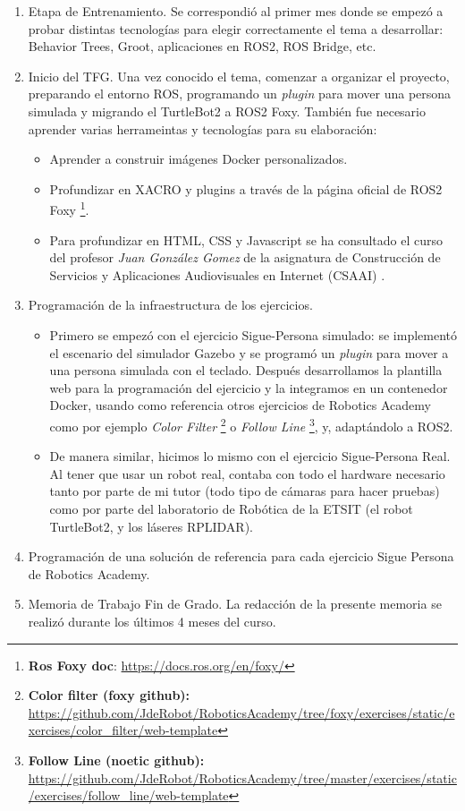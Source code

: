 \begin{enumerate}
	\item Etapa de Entrenamiento. Se correspondió al primer mes donde se empezó a probar distintas tecnologías para elegir correctamente el tema a desarrollar: Behavior Trees, Groot, aplicaciones en ROS2, ROS Bridge, etc.
	\item Inicio del TFG. Una vez conocido el tema, comenzar a organizar el proyecto, preparando el entorno ROS, programando un \textit{plugin} para mover una persona simulada y migrando el TurtleBot2 a ROS2 Foxy. También fue necesario aprender varias herrameintas y tecnologías para su elaboración:
	\begin{itemize}
		\item Aprender a construir imágenes Docker personalizados.
		\item Profundizar en XACRO y plugins a través de la página oficial de ROS2 Foxy \footnote{\textbf{Ros Foxy doc}: \url{https://docs.ros.org/en/foxy/}}.
		\item Para profundizar en HTML, CSS y Javascript se ha consultado el curso del profesor \textit{Juan González Gomez} de la asignatura de Construcción de Servicios y Aplicaciones Audiovisuales en Internet (CSAAI) \cite{CSAAI}.
	\end{itemize}
	\item Programación de la infraestructura de los ejercicios.
	\begin{itemize}
		\item Primero se empezó con el ejercicio Sigue-Persona simulado: se implementó el escenario del simulador Gazebo y se programó un \textit{plugin} para mover a una persona simulada con el teclado. Después desarrollamos la plantilla web para la programación del ejercicio y la integramos en un contenedor Docker, usando como referencia otros ejercicios de Robotics Academy como por ejemplo \textit{Color Filter} \footnote{\textbf{Color filter (foxy github):} \url{https://github.com/JdeRobot/RoboticsAcademy/tree/foxy/exercises/static/exercises/color_filter/web-template}} o \textit{Follow Line} \footnote{\textbf{Follow Line (noetic github):} \url{https://github.com/JdeRobot/RoboticsAcademy/tree/master/exercises/static/exercises/follow_line/web-template}}, y, adaptándolo a ROS2.
		\item De manera similar, hicimos lo mismo con el ejercicio Sigue-Persona Real. Al tener que usar un robot real, contaba con todo el hardware necesario tanto por parte de mi tutor (todo tipo de cámaras para hacer pruebas) como por parte del laboratorio de Robótica de la ETSIT (el robot TurtleBot2, y los láseres RPLIDAR).
	\end{itemize}
	\item Programación de una solución de referencia para cada ejercicio Sigue Persona de Robotics Academy.
	\item Memoria de Trabajo Fin de Grado. La redacción de la presente memoria se realizó durante los últimos 4 meses del curso. 
\end{enumerate}


